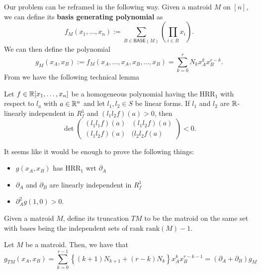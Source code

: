 \documentclass[12pt]{article}
\begin{document}
Our problem can be reframed in the following way. Given a matroid $M$ on $[n]$, we can define its \textbf{basis generating polynomial} as 
\[
	f_M (x_1, \ldots, x_n) := \sum_{B \in \mathsf{BASE}(M)} \left ( \prod_{i \in B} x_i \right ). 
\]
We can then define the polynomial
\[
	g_M (x_A, x_B) := f_M(x_A, \ldots, x_A, x_B, \ldots, x_B) = \sum_{k = 0}^r N_k x_A^k x_B^{r-k}.
\]
From \cite{MNY} we have the following technical lemma
\begin{lem}
	Let $f \in \mathbb{R}[x_1, \ldots, x_n]$ be a homogeneous polynomial having the $\text{HRR}_1$ with respect to $l_a$ with $a \in \mathbb{R}^n$ and let $l_1, l_2 \in S$ be linear forms. If $l_1$ and $l_2$ are $\mathbb{R}$-linearly independent in $R_f^1$ and $(l_1l_2f)(a) > 0$, then 
	\[
		\det \begin{pmatrix}
			(l_1l_1f)(a) & (l_1l_2f)(a) \\
			(l_1l_2f)(a) & (l_2l_2f(a)
		\end{pmatrix} < 0.
	\]
\end{lem}

It seems like it would be enough to prove the following things:
\begin{itemize}
	\item $g(x_A, x_B)$ has $\text{HRR}_1$ wrt $\partial_A$
	\item $\partial_A$ and $\partial_B$ are linearly independent in $R_f^1$
	\item $\partial_A^2 g (1, 0) > 0$. 
\end{itemize}

Given a matroid $M$, define its truncation $TM$ to be the matroid on the same set with bases being the independent sets of rank $\text{rank}(M) - 1$. 

\begin{prop}
	Let $M$ be a matroid. Then, we have that 
	\[
		g_{TM} (x_A, x_B) = \sum_{k = 0}^{r-1} \left \{ (k+1)N_{k+1} + (r-k) N_k\right \} x_A^k x_B^{r-k-1} = (\partial_A + \partial_B) g_M
	\]
\end{prop}
\end{document}
